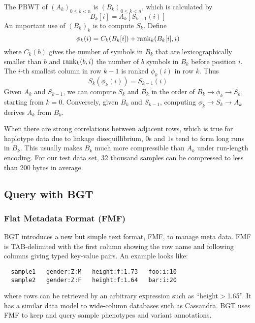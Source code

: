\documentclass{bioinfo}
\begin{document}
\begin{methods}
The PBWT of $(A_k)_{0\le k<n}$ is $(B_k)_{0\le k<n}$, which is
calculated by
\begin{equation*}\label{eq:B}
B_k[i]=A_k[S_{k-1}(i)]
\end{equation*}
An important use of $(B_k)_k$ is to compute $S_k$. Define
\begin{equation*}\label{eq:phi}
\phi_k(i)=C_k(B_k[i])+{\rm rank}_k(B_k[i],i)
\end{equation*}
where $C_k(b)$ gives the number of symbols in $B_k$ that are lexicographically
smaller than $b$ and ${\rm rank}_k(b,i)$ the number of $b$ symbols in $B_k$
before position $i$. The $i$-th smallest column in row $k-1$ is ranked
$\phi_k(i)$ in row $k$. Thus
\begin{equation*}\label{eq:trans}
S_k(\phi_k(i))=S_{k-1}(i)
\end{equation*}
Given $A_k$ and $S_{k-1}$, we can compute $S_k$ and $B_k$ in the order of
$B_k\to\phi_k\to S_k$, starting from $k=0$. Conversely, given $B_k$ and
$S_{k-1}$, computing $\phi_k\to S_k\to A_k$ derives $A_k$ from $B_k$.

When there are strong correlations between adjacent rows, which is true for
haplotype data due to linkage disequillibrium, $0$s and $1$s tend to form long
runs in $B_k$. This usually makes $B_k$ much more compressible than $A_k$ under
run-length encoding. For our test data set, 32 thousand samples can be
compressed to less than 200 bytes in average.

\subsection{Query with BGT}

\subsubsection{Flat Metadata Format (FMF)}

BGT introduces a new but simple text format, FMF, to manage meta data. FMF is
TAB-delimited with the first column showing the row name and following columns
giving typed key-value pairs. An example looks like:
\begin{center}
\begin{verbatim}
  sample1   gender:Z:M   height:f:1.73   foo:i:10
  sample2   gender:Z:F   height:f:1.64   bar:i:20
\end{verbatim}
\end{center}
where rows can be retrieved by an arbitrary expression such as
``height$>$1.65''. It has a similar data model to wide-column databases such as
Cassandra. BGT uses FMF to keep and query sample phenotypes and variant
annotations.


\end{methods}
\end{document}
